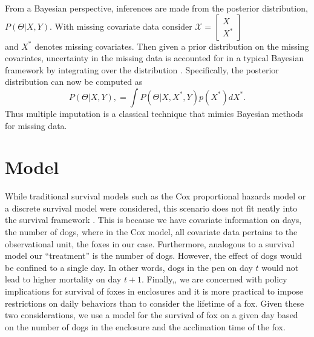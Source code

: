 \documentclass[aoas,preprint]{imsart}
\numberwithin{equation}{section}
\theoremstyle{plain}
\begin{document}
From a Bayesian perspective, inferences are made from the posterior distribution, $P(\Theta|X,Y).$ With missing covariate data consider $
	\mathcal{X}=\left[
	\begin{array}{ll}
	X \\
	X^{*} 
	\end{array}
	\right]$ \\ 
	and $X^{*}$ denotes missing covariates. Then given a prior distribution on the missing covariates, uncertainty in the missing data is accounted for in a typical Bayesian framework by integrating over the distribution \citep{boone2009}. Specifically, the posterior distribution can now be computed as $$P(\Theta|X,Y), = \int P(\Theta|X,X^{*},Y) p(X^{*}) dX^{*}.$$
Thus multiple imputation is a classical technique that mimics Bayesian methods for missing data.
\section{Model} While traditional survival models such as the Cox proportional hazards model \citep{cox} or a discrete survival model were considered, this scenario does not fit neatly into the survival framework \citep{klein}. This is because we have covariate information on days, the number of dogs, where in the Cox model, all covariate data pertains to the observational unit, the foxes in our case. Furthermore, analogous to a survival model our ``treatment'' is the number of dogs. However, the effect of dogs would be confined to a single day. In other words, dogs in the pen on day $t$ would not lead to higher mortality on day $t+1$. Finally,, we are concerned with policy implications for survival of foxes in enclosures and it is more practical to impose restrictions on daily behaviors than to consider the lifetime of a fox. Given these two considerations, we use a model for the survival of fox on a given day based on the number of dogs in the enclosure and the acclimation time of the fox.
\end{document}
